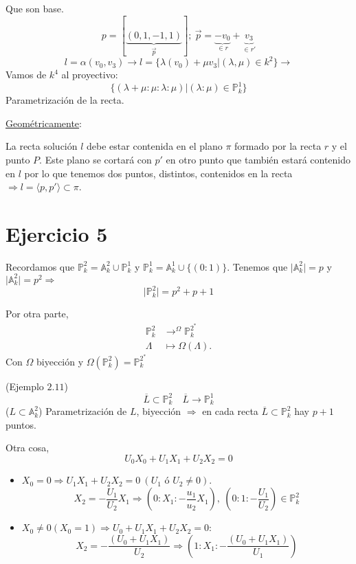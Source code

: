 \documentclass[10pt,a4paper,openright]{book}
\theoremstyle{break}
\begin{document}
Que son base.
\[
p = \left[ \underbrace{\left( 0, 1, -1, 1 \right)}_{\overrightarrow{p}} \right];\ \overrightarrow{p} = \underbrace{-v_0}_{\in r} + \underbrace{v_3}_{\in r'} 
\]\[
l = \alpha\left( v_0, v_3 \right) \rightarrow l = \{\lambda \left( v_0 \right) + \mu v_3 | \left( \lambda, \mu \right) \in k^2\} \rightarrow
\]
Vamos de $k^4$ al proyectivo:
\[
\{\left( \lambda + \mu : \mu : \lambda : \mu \right) | \left( \lambda : \mu \right) \in \mathbb{P}^{1}_{k}\} 
\]
Parametrización de la recta.

\underline{Geométricamente}: 

La recta solución $l$ debe estar contenida en el plano $\pi$ formado por la recta $r$ y el punto $P$. Este plano se cortará con $p'$ en otro punto que también estará contenido en $l$ por lo que tenemos dos puntos, distintos, contenidos en la recta $\Rightarrow l = \langle p, p' \rangle \subset \pi$.

\section{Ejercicio 5}%
\label{sec:ejercicio_5}
Recordamos que $\mathbb{P}^{2}_{k} = \mathbb{A}^{2}_k \cup \mathbb{P}^{1}_{k}$ y $\mathbb{P}^{1}_{k} = \mathbb{A}^{1}_k \cup \{\left( 0 : 1 \right)\}$. Tenemos que $\lvert \mathbb{A}^{2}_k \rvert = p$ y $\lvert \mathbb{A}^{2}_k \rvert = p^2 \Rightarrow$ 
\[
\lvert \mathbb{P}^{2}_{k} \rvert = p^2 + p + 1
\]

Por otra parte, 
\begin{align*}
    \mathbb{P}^{2}_{k} &\rightarrow^{\Omega} \mathbb{P}^{2^*}_{k} \\
    \Lambda &\mapsto \Omega\left( \Lambda \right) 
.\end{align*}
Con $\Omega$ biyección y $\Omega\left( \mathbb{P}^{2}_{k} \right) = \mathbb{P}^{2^*}_{k} $

(Ejemplo $2.11$)
\[
\overline{L} \subset \mathbb{P}^{2}_{k} \quad \overline{L} \rightarrow \mathbb{P}^{1}_{k} 
\]
($L \subset \mathbb{A}^{2}_k$) Parametrización de $L$, biyección $\Rightarrow$ en cada recta $\overline{L} \subset \mathbb{P}^{2}_{k}$ hay $p + 1$ puntos.

Otra cosa, 
\[
U_0X_0 + U_1X_1 + U_2X_2 = 0
\]
\begin{itemize}
    \item $X_0 = 0 \Rightarrow U_1X_1 + U_2X_2 = 0\ \left( U_1 \text{ ó } U_2 \neq 0 \right)$. 
    \[
    X_2 = -\frac{U_1}{U_2} X_1 \Rightarrow \left( 0 : X_1 : -\frac{u_1}{u_2} X_1 \right),\ \left( 0 : 1 : -\frac{U_1}{U_2} \right) \in \mathbb{P}^{2}_{k} 
    \]
    \item $X_0 \neq 0 \left( X_0 = 1 \right) \Rightarrow U_0 + U_1X_1 + U_2X_2 = 0$:
    \[
    X_2 = -\frac{\left( U_0 + U_1X_1 \right)}{U_2} \Rightarrow \left( 1 : X_1 : -\frac{\left( U_0 + U_1X_1 \right)}{U_1} \right)
    \]
\end{itemize}
\end{document}
